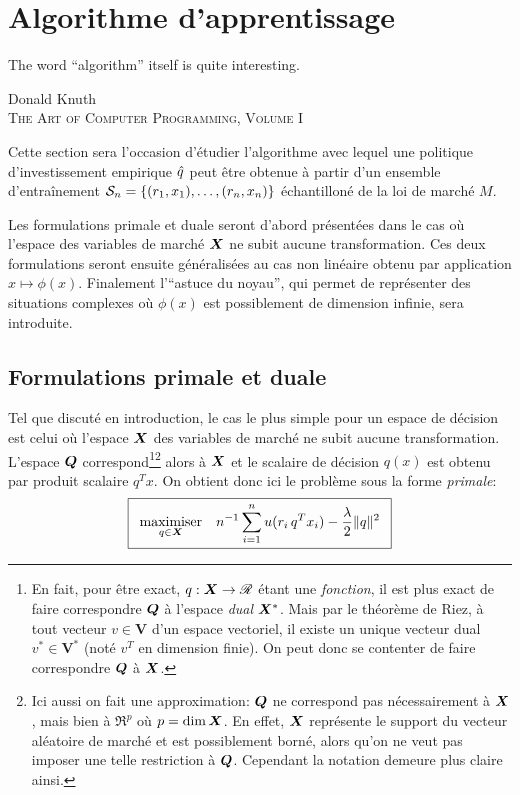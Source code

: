 \section{Algorithme d'apprentissage}
\label{sec:kernel}

\epigraph{The word ``algorithm'' itself is quite interesting.}{Donald Knuth\\\textsc{The
    Art of Computer Programming, Volume I}}


Cette section sera l'occasion d'étudier l'algorithme avec lequel une politique
d'investissement empirique $\qh$ peut être obtenue à partir d'un ensemble d'entraînement
$\S_n = \{(r_1,x_1),\ldots,(r_n,x_n)\}$ échantilloné de la loi de marché $M$.

Les formulations primale et duale seront d'abord présentées dans le cas où l'espace des
variables de marché $\X$ ne subit aucune transformation. Ces deux formulations seront
ensuite généralisées au cas non linéaire obtenu par application $x \mapsto \phi(x)$. Finalement
l'``astuce du noyau'', qui permet de représenter des situations complexes où $\phi(x)$ est
possiblement de dimension infinie, sera introduite. 


\subsection{Formulations primale et duale}

Tel que discuté en introduction, le cas le plus simple pour un espace de décision est
celui où l'espace $\X$ des variables de marché ne subit aucune transformation. L'espace
$\Q$ correspond\footnote{En fait, pour être exact, $q : \X \to \Re$ étant une
  \textit{fonction}, il est plus exact de faire correspondre $\Q$ à l'espace \textit{dual}
  $\X^*$. Mais par le théorème de Riez, à tout vecteur $v \in \bm V$ d'un espace vectoriel,
  il existe un unique vecteur dual $v^* \in \bm V^*$ (noté $v^T$ en dimension finie). On
  peut donc se contenter de faire correspondre $\Q$ à $\X$.}\footnote{Ici aussi on fait
  une approximation: $\Q$ ne correspond pas nécessairement à $\X$, mais bien à $\Re^p$ où
  $p = \dim\X$. En effet, $\X$ représente le support du vecteur aléatoire de marché et est
  possiblement borné, alors qu'on ne veut pas imposer une telle restriction à
  $\Q$. Cependant la notation demeure plus claire ainsi. } alors à $\X$ et le scalaire de
décision $q(x)$ est obtenu par produit scalaire $q^Tx$. On obtient donc ici le problème
sous la forme \textit{primale}: {\begin{equation} \boxed{
      \maximizeEquation[q\in\X]{n^{-1}\sumi u(r_i\,q^Tx_i) - \frac{\lambda}{2}\|q\|^2}}
\end{equation}
\vspace{-\baselineskip}}

